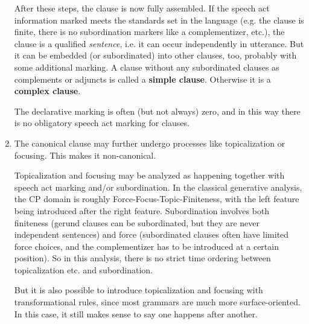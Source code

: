 \documentclass{article}
\newcommand*{\concept}[1]{\textbf{#1}}
\begin{document}
\begin{enumerate}
    After these steps, the clause is now fully assembled. 
    If the speech act information marked meets the standards set in the language
    (e.g. the clause is finite, there is no subordination markers like a complementizer, etc.), 
    the clause is a qualified \emph{sentence}, 
    i.e. it can occur independently in utterance.
    But it can be embedded (or subordinated) into other clauses, too, probably with some additional marking.
    A clause without any subordinated clauses as complements or adjuncts is called a \concept{simple clause}.
    Otherwise it is a \concept{complex clause}.

    The declarative marking is often (but not always) zero, 
    and in this way there is no obligatory speech act marking for clauses. 

    \item The canonical clause may further undergo processes like topicalization or focusing.
    This makes it non-canonical.

    Topicalization and focusing may be analyzed as happening together 
    with speech act marking and/or subordination.
    In the classical generative analysis, the CP domain is roughly Force-Focus-Topic-Finiteness,
    with the left feature being introduced after the right feature.
    Subordination involves both 
    finiteness (gerund clauses can be subordinated, but they are never independent sentences) 
    and force (subordinated clauses often have limited force choices, 
    and the complementizer has to be introduced at a certain position).
    So in this analysis, there is no strict time ordering between topicalization etc. and subordination.

    But it is also possible to introduce topicalization and focusing with transformational rules,
    since most grammars are much more surface-oriented.
    In this case, it still makes sense to say one happens after another.


\end{enumerate}
\end{document}
